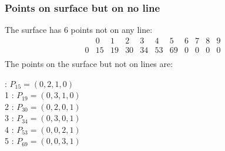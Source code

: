 \documentclass{article}
\begin{document}
{\subsubsection*{Points on surface but on no line}
The surface has 6 points not on any line:\\
$$
\begin{array}{r|*{10}{r}}
 & 0 & 1 & 2 & 3 & 4 & 5 & 6 & 7 & 8 & 9\\
\hline
0 & 15 & 19 & 30 & 34 & 53 & 69 & 0 & 0 & 0 & 0\\
\end{array}
$$
The points on the surface but not on lines are:\\
\begin{multicols}{2}
 : $P_{15}=( 0, 2, 1, 0 )$\\
1 : $P_{19}=( 0, 3, 1, 0 )$\\
2 : $P_{30}=( 0, 2, 0, 1 )$\\
3 : $P_{34}=( 0, 3, 0, 1 )$\\
4 : $P_{53}=( 0, 0, 2, 1 )$\\
5 : $P_{69}=( 0, 0, 3, 1 )$\\
\end{multicols}
}
\end{document}
